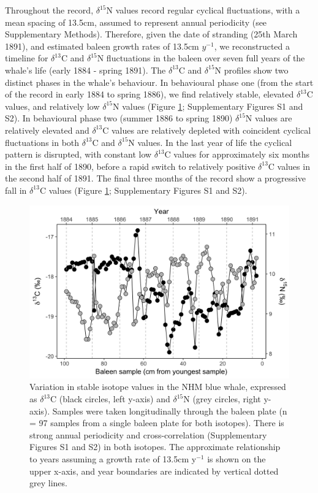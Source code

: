 \documentclass[a4paper,12pt]{article}
\begin{document}
Throughout the record, $\delta^{15}$N values record regular cyclical fluctuations, with a mean spacing of 13.5cm, assumed to represent annual periodicity (see Supplementary Methods). 
Therefore, given the date of stranding (25th March 1891), and estimated baleen growth rates of 13.5cm $y^{-1}$, we reconstructed a timeline for $\delta^{13}$C and $\delta^{15}$N fluctuations in the baleen over seven full years of the whale's life (early 1884 - spring 1891). 
The $\delta^{13}$C and $\delta^{15}$N profiles show two distinct phases in the whale's behaviour. 
In behavioural phase one (from the start of the record in early 1884 to spring 1886), we find relatively stable, elevated $\delta^{13}$C values, and relatively low $\delta^{15}$N values (Figure \ref{fig1}; Supplementary Figures S1 and S2). 
In behavioural phase two (summer 1886 to spring 1890) $\delta^{15}$N values are relatively elevated and $\delta^{13}$C values are relatively depleted with coincident cyclical fluctuations in both $\delta^{13}$C and $\delta^{15}$N values. 
In the last year of life the cyclical pattern is disrupted, with constant low $\delta^{13}$C values for approximately six months in the first half of 1890, before a rapid switch to relatively positive $\delta^{13}$C values in the second half of 1891. 
The final three months of the record show a progressive fall in $\delta^{13}$C values (Figure \ref{fig1}; Supplementary Figures S1 and S2).

\begin{figure}
  \centering
  \includegraphics[width = \linewidth]{figures/Figure-1-raw-dC-dN-data.png}
  \caption{Variation in stable isotope values in the NHM blue whale, expressed as $\delta^{13}$C (black circles, left y-axis) and $\delta^{15}$N (grey circles, right y-axis). Samples were taken longitudinally through the baleen plate (n = 97 samples from a single baleen plate for both isotopes). There is strong annual periodicity and cross-correlation (Supplementary Figures S1 and S2) in both isotopes. The approximate relationship to years assuming a growth rate of 13.5cm y$^{-1}$ is shown on the upper x-axis, and year boundaries are indicated by vertical dotted grey lines.}
  \label{fig1}
\end{figure}
\end{document}
